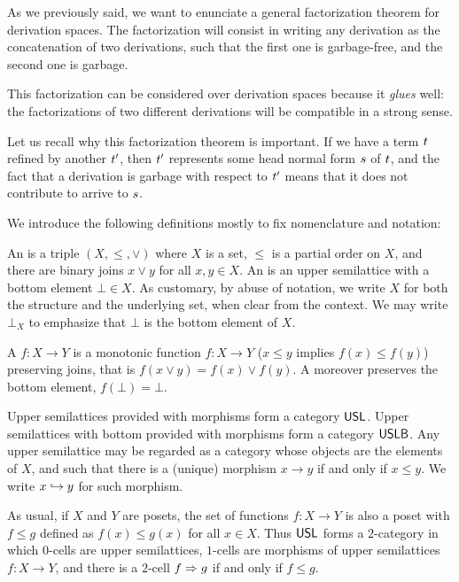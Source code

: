 
As we previously said, we want to enunciate a general
factorization theorem for derivation spaces.
The factorization will consist in writing any derivation as
the concatenation of two derivations, such that the first one is garbage-free,
and the second one is garbage.

This factorization can be considered over derivation spaces because
it \emph{glues} well: the factorizations of two different derivations will
be compatible in a strong sense.

Let us recall why this factorization theorem is important.
If we have a term $\tm$ refined by another $\tm'$, then
$\tm'$ represents some head normal form $\tmtwo$ of $\tm$,
and the fact that a derivation is garbage with respect to $\tm'$
means that it does not contribute to arrive to $\tmtwo$.


We introduce the following definitions mostly to fix nomenclature and notation:

\begin{definition}
An  is a triple $(X,\leq,\lor)$
where $X$ is a set, $\leq$ is a partial order on $X$,
and there are binary joins $x \lor y$ for all $x, y \in X$.
An  is an upper semilattice
with a bottom element $\bot \in X$.
As customary, by abuse of notation, we write $X$ for both the structure
and the underlying set, when clear from the context.
We may write $\bot_X$ to emphasize that $\bot$ is the bottom element of $X$.

A  $f : X \to Y$
is a monotonic function $f : X \to Y$
(\ie $x \leq y$ implies $f(x) \leq f(y)$)
preserving joins,
that is $f(x \lor y) = f(x) \lor f(y)$.
A 
moreover preserves the bottom element, \ie $f(\bot) = \bot$.

Upper semilattices provided with morphisms form a category $\USL$.
Upper semilattices with bottom provided with morphisms form a category $\USLB$.
Any upper semilattice may be regarded as a category
whose objects are the elements of $X$, and such that there is a (unique) morphism
$x \to y$ if and only if $x \leq y$.
We write $\pt{y}{x}$ for such morphism.

As usual, if $X$ and $Y$ are posets, the set of functions $f : X \to Y$
is also a poset with $f \leq g$ defined as $f(x) \leq g(x)$ for all $x \in X$.
Thus $\USL$ forms a $2$-category
in which $0$-cells are upper semilattices,
$1$-cells are morphisms of upper semilattices $f : X \to Y$, 
and there is a $2$-cell $f \totwo g$ if and only if $f \leq g$.
\end{definition}

